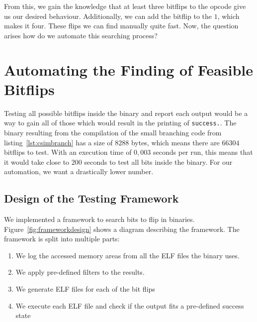 From this, we gain the knowledge that at least three bitflips to the opcode give
us our desired behaviour. Additionally, we can add the bitflip to the $1$, which
makes it four. These flips we can find manually quite fast. Now, the question
arises how do we automate this searching process?

\section{Automating the Finding of Feasible Bitflips}

Testing all possible bitflips inside the binary and report each output would be
a way to gain all of those which would result in the printing of
\texttt{success.}. The binary resulting from the compilation of the small
branching code from listing~\ref{lst:csimbranch} has a size of $8288$ bytes,
which means there are $66304$ bitflips to test. With an execution time of
$0,003$ seconds per run, this means that it would take close to $200$ seconds to
test all bits inside the binary. For our automation, we want a drastically lower
number.

\subsection{Design of the Testing Framework}

We implemented a framework to search bits to flip in binaries.
Figure~\ref{fig:frameworkdesign} shows a diagram describing the framework. The
framework is split into multiple parts:

\begin{enumerate}
\item We log the accessed memory areas from all the ELF files the binary uses.
\item We apply pre-defined filters to the results.
\item We generate ELF files for each of the bit flips
\item We execute each ELF file and check if the output fits a pre-defined
success state
\end{enumerate}

